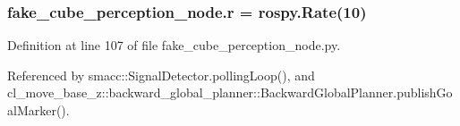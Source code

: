 \subsubsection[{\texorpdfstring{r}{r}}]{\setlength{\rightskip}{0pt plus 5cm}fake\+\_\+cube\+\_\+perception\+\_\+node.\+r = rospy.\+Rate(10)}\hypertarget{namespacefake__cube__perception__node_a36e88703ab69fd35065e8a8d9344903e}{}\label{namespacefake__cube__perception__node_a36e88703ab69fd35065e8a8d9344903e}


Definition at line 107 of file fake\+\_\+cube\+\_\+perception\+\_\+node.\+py.



Referenced by smacc\+::\+Signal\+Detector.\+polling\+Loop(), and cl\+\_\+move\+\_\+base\+\_\+z\+::backward\+\_\+global\+\_\+planner\+::\+Backward\+Global\+Planner.\+publish\+Goal\+Marker().

